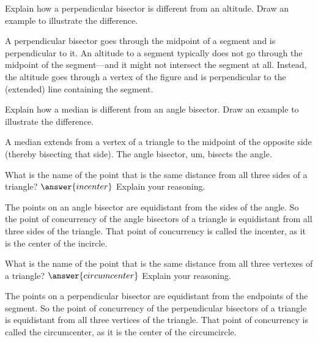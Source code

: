 \documentclass[nooutcomes]{ximera}
\begin{document}
\begin{problem}
Explain how a perpendicular bisector is different from an
  altitude. Draw an example to illustrate the difference.
\begin{freeResponse}
\begin{hint}
A perpendicular bisector goes through the midpoint of a segment and is perpendicular to it.  An altitude to a segment typically does not go through the midpoint of the segment---and it might not intersect the segment at all.  Instead, the altitude goes through a vertex of the figure and is perpendicular to the (extended) line containing the segment.    
\end{hint}
\end{freeResponse}
\end{problem}

\begin{problem}
Explain how a median is different from an angle bisector.  Draw an
  example to illustrate the difference.
\begin{freeResponse}
\begin{hint}
A median extends from a vertex of a triangle to the midpoint of the opposite side (thereby bisecting that side).  The angle bisector, um, bisects the angle.
\end{hint}
\end{freeResponse}
\end{problem}

\begin{problem}
What is the name of the point that is the same distance from all
  three sides of a triangle? $\answer{incenter}$  Explain your reasoning.
\begin{freeResponse}
\begin{hint}
The points on an angle bisector are equidistant from the sides of the angle.  So the point of concurrency of the angle bisectors of a triangle is equidistant from all three sides of the triangle.  That point of concurrency is called the incenter, as it is the center of the incircle.  
\end{hint}
\end{freeResponse}
\end{problem}

\begin{problem}
What is the name of the point that is the same distance from all
  three vertexes of a triangle? $\answer{circumcenter}$ 
  Explain your reasoning.
\begin{freeResponse}
\begin{hint}
The points on a perpendicular bisector are equidistant from the endpoints of the segment.  So the point of concurrency of the perpendicular bisectors of a triangle is equidistant from all three vertices of the triangle.  That point of concurrency is called the circumcenter, as it is the center of the circumcircle.  
\end{hint}
\end{freeResponse}
\end{problem}
\end{document}

